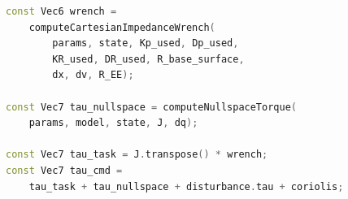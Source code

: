 \begin{lstlisting}[style=cppstyle, language=C++, caption={Final joint-torque assembly (abridged).}, label={lst:implementation_pose_error}]
const Vec6 wrench =
    computeCartesianImpedanceWrench(
        params, state, Kp_used, Dp_used,
        KR_used, DR_used, R_base_surface,
        dx, dv, R_EE);

const Vec7 tau_nullspace = computeNullspaceTorque(
    params, model, state, J, dq);

const Vec7 tau_task = J.transpose() * wrench;
const Vec7 tau_cmd =
    tau_task + tau_nullspace + disturbance.tau + coriolis;
\end{lstlisting}

